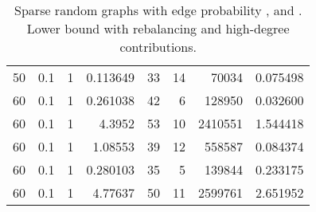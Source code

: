 \documentclass[a4paper,11pt]{article}
\begin{document}
\begin{table}
\begin{center}
\begin{tabular}{|rrr|r|r|rr|r|}
50 & 0.1 & 1 & 0.113649 & 33 & 14 & 70034 & 0.075498 \\
60 & 0.1 & 1 & 0.261038 & 42 & 6 & 128950 & 0.032600 \\
60 & 0.1 & 1 & 4.3952 & 53 & 10 & 2410551 & 1.544418 \\
60 & 0.1 & 1 & 1.08553 & 39 & 12 & 558587 & 0.084374 \\
60 & 0.1 & 1 & 0.280103 & 35 & 5 & 139844 & 0.233175 \\
60 & 0.1 & 1 & 4.77637 & 50 & 11 & 2599761 & 2.651952 \\
\hline
\end{tabular}
\end{center}
\caption{Sparse random graphs with edge probability ,
   and . Lower bound with rebalancing and 
  high-degree contributions.}
\label{tab:sparse-highdegree}
\end{table}
\end{document}
